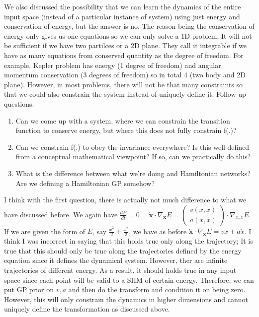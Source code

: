\documentclass{article}
\begin{document}
We also discussed the possibility that we can learn the dynamics of the entire input space (instead of a particular instance of system) using just energy and conservation of energy, but the answer is no.
The reason being the conservation of energy only gives us one equations so we can only solve a 1D problem.
It will not be sufficient if we have two partilces or a 2D plane.
They call it integrable if we have as many equations from conserved quantity as the degree of freedom.
For example, Kepler problem has energy (1 degree of freedom) and angular momentum conservation (3 degrees of freedom) so in total 4 (two body and 2D plane).
However, in most problems, there will not be that many constraints so that we could also constrain the system instead of uniquely define it.
\newline
Follow up questions:
\begin{enumerate}
  \item Can we come up with a system, where we can constrain the transition function to conserve energy, but where this does not fully constrain f(.)?
  \item Can we constrain f(.) to obey the invariance everywhere? Is this well-defined from a conceptual mathematical viewpoint? If so, can we practically do this?
  \item What is the difference between what we're doing and Hamiltonian networks? Are we defining a Hamiltonian GP somehow?
\end{enumerate}

I think with the first question, there is actually not much difference to what we have discussed before. 
We again have $\frac{dE}{dt} = 0 = \mathbf{\dot{x}} \cdot \nabla_{\mathbf{x}}E = \begin{pmatrix}
  v(x, \dot{x})\\ a(x, \dot{x})
\end{pmatrix} \cdot \nabla_{x, \dot{x}}E$.
If we are given the form of $E$, say $\frac{\dot{x}^2}{2}+\frac{x^2}{2}$, we have as before $\mathbf{\dot{x}} \cdot \nabla_{\mathbf{x}}E = vx+a\dot{x}$.
I think I was incorrect in saying that this holds true only along the trajectory; It is true that this should only be true along the trajectories defined by the energy equation since it defines the dynamical system. 
However, ther are infinite trajectories of different energy.
As a result, it should holds true in any input space since each point will be valid to a SHM of certain energy.
Therefore, we can put GP prior on $v, a$ and then do the transform and condition it on being zero.
However, this will only constrain the dynamics in higher dimensions and cannot uniquely define the transformation as discussed above. 
\end{document}
